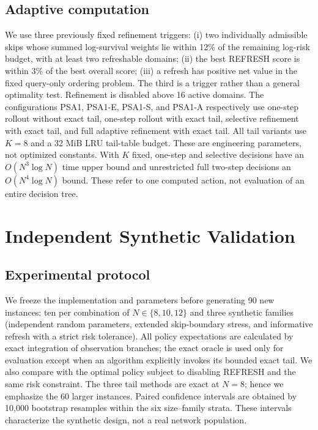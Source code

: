 \documentclass[conference]{IEEEtran}
\begin{document}
\subsection{Adaptive computation}
We use three previously fixed refinement triggers: (i) two individually
admissible skips whose summed log-survival weights lie within 12\% of the
remaining log-risk budget, with at least two refreshable domains;
(ii) the best REFRESH score is within 3\% of the best overall score;
(iii) a refresh has positive net value in the fixed query-only ordering
problem. The third is a trigger rather than a general optimality test.
Refinement is disabled above 16 active domains. The configurations
PSA1, PSA1-E, PSA1-S, and PSA1-A respectively use one-step rollout without
exact tail, one-step rollout with exact tail, selective refinement with
exact tail, and full adaptive refinement with exact tail. All tail
variants use $K=8$ and a 32 MiB LRU tail-table budget. These are engineering
parameters, not optimized constants. With $K$ fixed, one-step and
selective decisions have an $O(N^3\log N)$ time upper bound and unrestricted
full two-step decisions an $O(N^4\log N)$ bound. These refer to one
computed action, not evaluation of an entire decision tree.

\section{Independent Synthetic Validation}
\subsection{Experimental protocol}
We freeze the implementation and parameters before generating 90 new
instances: ten per combination of $N\in\{8,10,12\}$ and three synthetic
families (independent random parameters, extended skip-boundary stress,
and informative refresh with a strict risk tolerance). All policy
expectations are calculated by exact integration of observation branches;
the exact oracle is used only for evaluation except when an algorithm
explicitly invokes its bounded exact tail. We also compare with the
optimal policy subject to disabling REFRESH and the same risk constraint.
The three tail methods are exact at $N=8$; hence we emphasize the 60
larger instances. Paired confidence intervals are obtained by 10,000
bootstrap resamples within the six size--family strata. These intervals
characterize the synthetic design, not a real network population.
\end{document}
